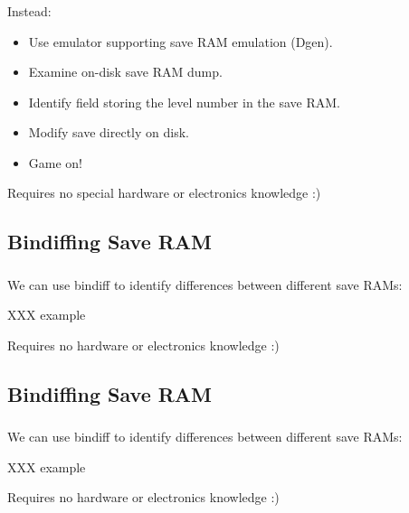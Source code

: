 \documentclass{beamer}
\begin{document}
\begin{frame}[fragile]
\frametitle{\insertsubsection}

Instead:

\begin{itemize}
\item Use emulator supporting save RAM emulation (Dgen).
\item Examine on-disk save RAM dump.
\item Identify field storing the level number in the save RAM.
\item Modify save directly on disk.
\item Game on!
\end{itemize}

\vfill

Requires no special hardware or electronics knowledge :)

\end{frame}


\subsection{Bindiffing Save RAM}

\begin{frame}[fragile]
\frametitle{\insertsubsection}

We can use bindiff to identify differences between different save RAMs:

XXX example

\vfill

Requires no hardware or electronics knowledge :)

\end{frame}


\subsection{Bindiffing Save RAM}

\begin{frame}[fragile]
\frametitle{\insertsubsection}

We can use bindiff to identify differences between different save RAMs:

XXX example

\vfill

Requires no hardware or electronics knowledge :)

\end{frame}
\end{document}
